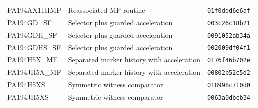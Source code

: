 \begin{longtable}{p{43mm}p{73mm}p{25mm}}
PA194AX11HMP & Reassociated MP routine & \texttt{01f0ddd6e6af}\\
PA194GD\_SF & Selector plus guarded acceleration & \texttt{003c26c18b21}\\
PA194GDH\_SF & Selector plus guarded acceleration & \texttt{0091052ab34a}\\
PA194GDHS\_SF & Selector plus guarded acceleration & \texttt{002009df04f1}\\
PA194H5X\_MF & Separated marker history with acceleration & \texttt{0176f46b702e}\\
PA194JH5X\_MF & Separated marker history with acceleration & \texttt{00802b52c5d2}\\
PA194H5XS & Symmetric witness comparator & \texttt{018998c710d0}\\
PA194JH5XS & Symmetric witness comparator & \texttt{0063a0dbcb34}\\
\end{longtable}\endgroup
